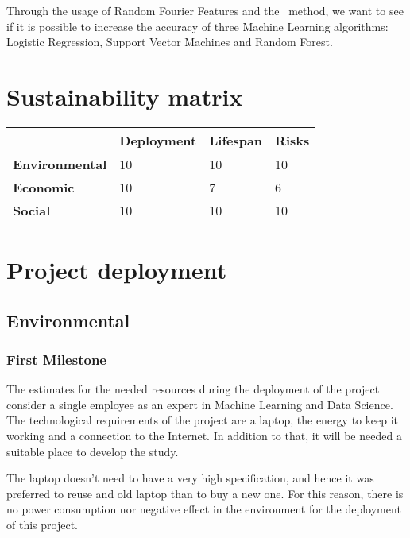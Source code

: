   Through the usage of Random Fourier Features and the \Nys\ method, we want to see
  if it is possible to increase the accuracy of three Machine Learning algorithms:
  Logistic Regression, Support Vector Machines and Random Forest.

  \section{Sustainability matrix}

  \begin{table}[H]
\begin{tabular}{|l|l|l|l|}
\hline
                       & \textbf{Deployment} & \textbf{Lifespan} & \textbf{Risks} \\ \hline
\textbf{Environmental} & 10                   & 10                 & 10              \\ \hline
\textbf{Economic}      & 10                   & 7                 & 6              \\ \hline
\textbf{Social}        & 10                   & 10                 & 10              \\ \hline
\end{tabular}
\end{table}


  \section{Project deployment}
    \subsection{Environmental}
      \subsubsection*{First Milestone}

    The estimates for the needed resources during the deployment of the project
    consider a single employee as an expert in Machine Learning and Data Science.
    The technological requirements of the project are a laptop, the energy to
    keep it working and a connection to the Internet. In addition to that, it will
    be needed a suitable place to develop the study.

    The laptop doesn't need to have a very high specification, and hence it was
    preferred to reuse and old laptop than to buy a new one. For this reason, there
    is no power consumption nor negative effect in the environment for the deployment
    of this project.


